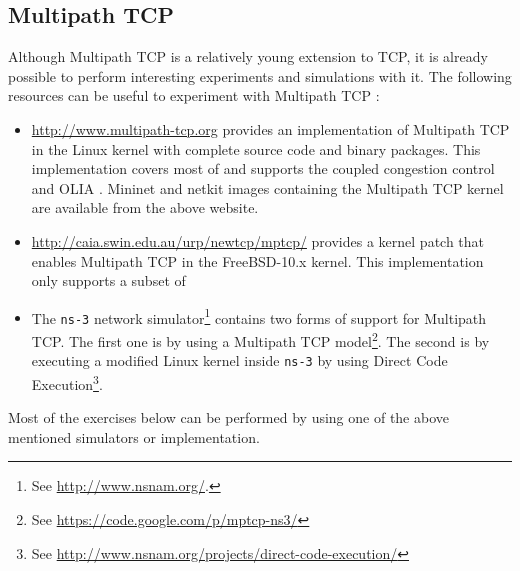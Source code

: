 \subsection{Multipath TCP}

Although Multipath TCP is a relatively young extension to TCP, it is already possible to perform interesting experiments and simulations with it. The following resources can be useful to experiment with Multipath TCP :

\begin{itemize}
\item \url{http://www.multipath-tcp.org} provides an implementation of Multipath TCP in the Linux kernel with complete source code and binary packages. This implementation covers most of \cite{rfc6824} and supports the coupled congestion control \cite{rfc6356} and OLIA \cite{olia}. Mininet and netkit images containing the Multipath TCP kernel are available from the above website.
\item \url{http://caia.swin.edu.au/urp/newtcp/mptcp/} provides a kernel patch that enables Multipath TCP in the FreeBSD-10.x kernel. This implementation only supports a subset of \cite{rfc6824}
\item The \texttt{ns-3} network simulator\footnote{See \url{http://www.nsnam.org/}.} contains two forms of support for Multipath TCP. The first one is by using a Multipath TCP model\footnote{See \url{https://code.google.com/p/mptcp-ns3/}}. The second is by executing a modified Linux kernel inside \texttt{ns-3}  by using Direct Code Execution\footnote{See \url{http://www.nsnam.org/projects/direct-code-execution/}}.

\end{itemize}

Most of the exercises below can be performed by using one of the above mentioned simulators or implementation. 

